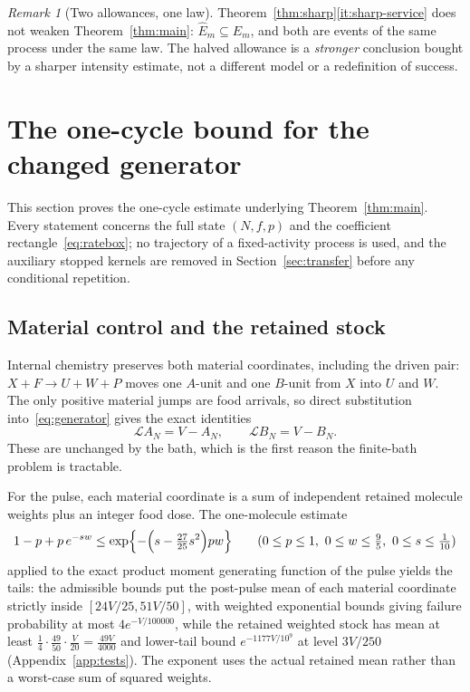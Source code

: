 \documentclass[11pt,a4paper]{article}
\theoremstyle{plain}
\theoremstyle{definition}
\theoremstyle{remark}
\newtheorem{remark}[theorem]{Remark}
\newcommand{\Lgen}{\mathcal L}
\begin{document}
\begin{remark}[Two allowances, one law]\label{rem:twoallowances}
Theorem~\ref{thm:sharp}\ref{it:sharp-service} does not weaken Theorem~\ref{thm:main}: $\widehat E_m\subseteq E_m$, and both are events of the same process under the same law. The halved allowance is a \emph{stronger} conclusion bought by a sharper intensity estimate, not a different model or a redefinition of success.
\end{remark}

\section{The one-cycle bound for the changed generator}\label{sec:proof}

This section proves the one-cycle estimate underlying Theorem~\ref{thm:main}. Every statement concerns the full state $(N,f,p)$ and the coefficient rectangle~\eqref{eq:ratebox}; no trajectory of a fixed-activity process is used, and the auxiliary stopped kernels are removed in Section~\ref{sec:transfer} before any conditional repetition.

\subsection{Material control and the retained stock}\label{sec:material}

Internal chemistry preserves both material coordinates, including the driven pair: $X+F\to U+W+P$ moves one $A$-unit and one $B$-unit from $X$ into $U$ and $W$. The only positive material jumps are food arrivals, so direct substitution into~\eqref{eq:generator} gives the exact identities
\begin{equation}\label{eq:drift}
\Lgen A_N=V-A_N,\qquad \Lgen B_N=V-B_N .
\end{equation}
These are unchanged by the bath, which is the first reason the finite-bath problem is tractable.

For the pulse, each material coordinate is a sum of independent retained molecule weights plus an integer food dose. The one-molecule estimate
\[
1-p+p\,e^{-sw}\le\exp\Bigl\{-\Bigl(s-\tfrac{27}{25}s^2\Bigr)pw\Bigr\}\qquad(0\le p\le1,\ 0\le w\le\tfrac95,\ 0\le s\le\tfrac1{10})
\]
applied to the exact product moment generating function of the pulse yields the tails: the admissible bounds put the post-pulse mean of each material coordinate strictly inside $[24V/25,51V/50]$, with weighted exponential bounds giving failure probability at most $4e^{-V/100000}$, while the retained weighted stock has mean at least $\tfrac14\cdot\tfrac{49}{50}\cdot\tfrac V{20}=\tfrac{49V}{4000}$ and lower-tail bound $e^{-1177V/10^9}$ at level $3V/250$ (Appendix~\ref{app:tests}). The exponent uses the actual retained mean rather than a worst-case sum of squared weights.
\end{document}
